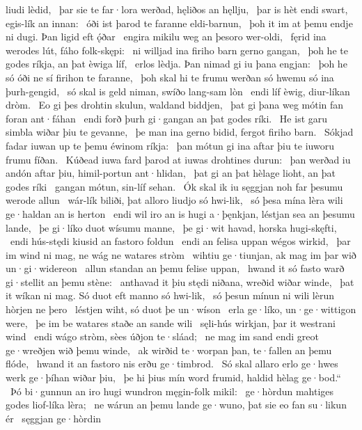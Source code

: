 liudi lèdid, \hld\ þar sie te far·lora werðad,
hęliðos an hęllju, \hld\ þar is hèt endi swart,
egis-lík an innan: \hld\ óði ist þarod te faranne
eldi-barnun, \hld\ þoh it im at þemu endje ni dugi.
Þan ligid eft ǫ́ðar \hld\ engira mikilu
weg an þesoro wer-oldi, \hld\ fęrid ina werodes lút,
fáho folk-skępi: \hld\ ni willjad ina firiho barn
gerno gangan, \hld\ þoh he te godes ríkja,
an þat èwiga líf, \hld\ erlos lèdja.
Þan nimad gi iu þana engjan: \hld\ þoh he só óði ne sí
firihon te faranne, \hld\ þoh skal hi te frumu werðan
só hwemu só ina þurh-gengid, \hld\ só skal is geld niman,
swíðo lang-sam lòn \hld\ endi líf èwig,
diur-líkan dròm. \hld\ Eo gi þes drohtin skulun,
waldand biddjen, \hld\ þat gi þana weg mótin
fan foran ant·fáhan \hld\ endi forð þurh gi·gangan
an þat godes ríki. \hld\ He ist garu simbla
wiðar þiu te gevanne, \hld\ þe man ina gerno bidid,
fergot firiho barn. \hld\ Sókjad fadar iuwan
up te þemu éwinom ríkja: \hld\ þan mótun gi ina aftar þiu
te iuworu frumu fíðan. \hld\ Kúðead iuwa fard þarod
at iuwas drohtines durun: \hld\ þan werðad iu andón aftar þiu,
himil-portun ant·hlidan, \hld\ þat gi an þat hèlage lioht,
an þat godes ríki \hld\ gangan mótun,
sin-líf sehan. \hld\ Ók skal ik iu sęggjan noh
far þesumu werode allun \hld\ wár-lík biliði,
þat alloro liudjo só hwi-lik, \hld\ só þesa mína lèra wili
ge·haldan an is herton \hld\ endi wil iro an is hugi a·þęnkjan,
léstjan sea an þesumu lande, \hld\ þe gi·líko duot
wísumu manne, \hld\ þe gi·wit havad,
horska hugi-skęfti, \hld\ endi hús-stędi kiusid
an fastoro foldun \hld\ endi an felisa uppan
wégos wirkid, \hld\ þar im wind ni mag,
ne wág ne watares stròm \hld\ wihtiu ge·tiunjan,
ak mag im þar wið un·gi·widereon \hld\ allun standan
an þemu felise uppan, \hld\ hwand it só fasto warð
gi·stellit an þemu stène: \hld\ anthavad it þiu stędi niðana,
wreðid wiðar winde, \hld\ þat it wíkan ni mag.
Só duot eft manno só hwi-lik, \hld\ só þesun mínun ni wili
lèrun hòrjen ne þero \hld\ léstjen wiht,
só duot þe un·wíson \hld\ erla ge·líko,
un·ge·wittigon were, \hld\ þe im be watares staðe
an sande wili \hld\ sęli-hús wirkjan,
þar it westrani wind \hld\ endi wágo stròm,
sèes úðjon te·sláad; \hld\ ne mag im sand endi greot
ge·wreðjen wið þemu winde, \hld\ ak wirðid te·worpan þan,
te·fallen an þemu flóde, \hld\ hwand it an fastoro nis
erðu ge·timbrod. \hld\ Só skal allaro erlo ge·hwes
werk ge·þíhan wiðar þiu, \hld\ þe hi þius mín word frumid,
haldid hèlag ge·bod.“ \hld\ Þó bi·gunnun an iro hugi wundron
męgin-folk mikil: \hld\ ge·hòrdun mahtiges godes
liof-líka lèra; \hld\ ne wárun an þemu lande ge·wuno,
þat sie eo fan su·likun ér \hld\ sęggjan ge·hòrdin
